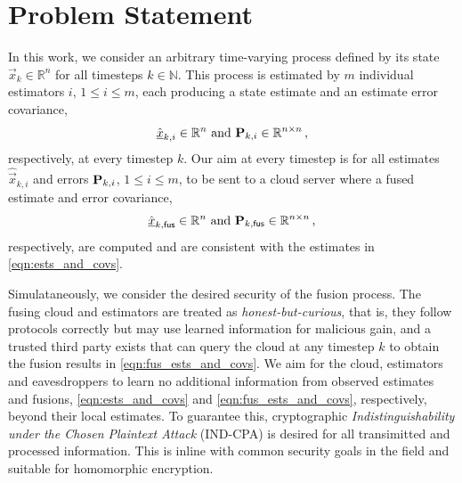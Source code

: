 \documentclass[letterpaper, 10 pt, conference]{ieeeconf}
\begin{document}
\section{Problem Statement}\label{sec:problem}
In this work, we consider an arbitrary time-varying process defined by its state $\vec{x}_k \in \mathbb{R}^n$ for all timesteps $k \in \mathbb{N}$. This process is estimated by $m$ individual estimators $i$, $1\leq i\leq m$, each producing a state estimate and an estimate error covariance,
\begin{equation}\label{eqn:ests_and_covs}
    \hat{{\underline{x}}}_{k,i} \in \mathbb{R}^n \text{ and } {\ensuremath{{\mathbf{P}}}}_{k,i} \in \mathbb{R}^{n\times n}\,,
\end{equation}
respectively, at every timestep $k$. Our aim at every timestep is for all estimates $\hat{\vec{x}}_{k,i}$ and errors ${{\mathbf{P}}}_{k,i}$, $1\leq i\leq m$, to be sent to a cloud server where a fused estimate and error covariance,
\begin{equation}\label{eqn:fus_ests_and_covs}
    \hat{{\underline{x}}}_{k,\mathsf{fus}} \in \mathbb{R}^n \text{ and } {\ensuremath{{\mathbf{P}}}}_{k,\mathsf{fus}} \in \mathbb{R}^{n\times n}\,,
\end{equation}
respectively, are computed and are consistent with the estimates in \eqref{eqn:ests_and_covs}.

Simulataneously, we consider the desired security of the fusion process. The fusing cloud and estimators are treated as \textit{honest-but-curious}, that is, they follow protocols correctly but may use learned information for malicious gain, and a trusted third party exists that can query the cloud at any timestep $k$ to obtain the fusion results in \eqref{eqn:fus_ests_and_covs}. We aim for the cloud, estimators and eavesdroppers to learn no additional information from observed estimates and fusions, \eqref{eqn:ests_and_covs} and \eqref{eqn:fus_ests_and_covs}, respectively, beyond their local estimates. To guarantee this, cryptographic \textit{Indistinguishability under the Chosen Plaintext Attack} (IND-CPA) \cite{katzIntroductionModernCryptography2008} is desired for all transimitted and processed information. This is inline with common security goals in the field and suitable for homomorphic encryption.

% 
%                                                                 
%                                                                 
%                                                                 
% 
\end{document}
